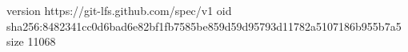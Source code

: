 version https://git-lfs.github.com/spec/v1
oid sha256:8482341cc0d6bad6e82bf1fb7585be859d59d95793d11782a5107186b955b7a5
size 11068
